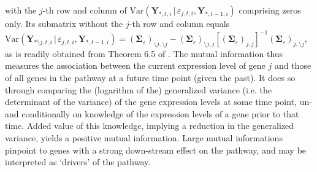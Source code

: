 with the $j$-th row and column of $\mbox{Var}( \mathbf{Y}_{\ast, t, i}  \, | \,  \varepsilon_{j, t, i}, \mathbf{Y}_{\ast, t-1, i})$ comprising zeros only. Its submatrix without the $j$-th row and column equals \\ $\mbox{Var}( \mathbf{Y}_{\ast \setminus j, t, i}  \, | \,  \varepsilon_{j, t, i}, \mathbf{Y}_{\ast, t-1, i})  = (\mathbf{\Sigma}_{\varepsilon})_{\setminus j, \setminus j} - (\mathbf{\Sigma}_{\varepsilon})_{\setminus j, j} [(\mathbf{\Sigma}_{\varepsilon})_{j, j}]^{-1} (\mathbf{\Sigma}_{\varepsilon})_{j, \setminus j},
$ as is readily obtained from Theorem 6.5 of \cite{Bickel2001}. The mutual information thus measures the association between the current expression level of gene $j$ and those of all genes in the pathway at a future time point (given the past). It does so through comparing the (logarithm of the) generalized variance (i.e. the determinant of the variance) of the gene expression levels at some time point, un- and conditionally on knowledge of the expression levels of a gene prior to that time. Added value of this knowledge, implying a reduction in the generalized variance, yields a positive mutual information. Large mutual informations pinpoint to genes with a strong down-stream effect on the pathway, and may be interpreted as `drivers' of the pathway.

